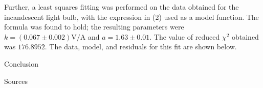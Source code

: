 \begin{paper}
	Further, a least squares fitting was performed on the data obtained for the incandescent light bulb, with the expression in (2) used as a model function. The formula was found to hold; the resulting parameters were \( k =  (0.067 \pm 0.002) \si{\volt\per\ampere} \) and \( a = 1.63 \pm 0.01 \). The value of reduced \( \chi ^ 2 \) obtained was \( 176.8952 \). The data, model, and residuals for this fit are shown below.

	 \vspace{1em}
	

	Conclusion


	Sources

\papersource{}

\end{paper}

